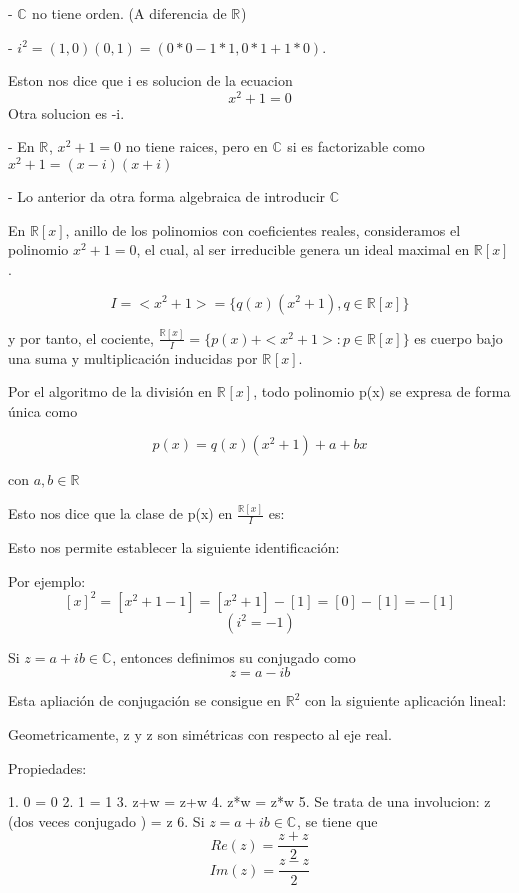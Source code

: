 - \( \mathbb{C}^{}\) no tiene orden. (A diferencia de \(\mathbb{R}^{}\))

- \(i^2 = (1,0)(0,1) = (0*0-1*1, 0*1+1*0)\).

Eston nos dice que i es solucion de la ecuacion
\begin{equation*}
  x^2+1=0
\end{equation*}
Otra solucion es -i.

- En \(\mathbb{R}^{}\), \(x^2+1=0 \) no tiene raices, pero en \(\mathbb{C}^{}\) si es factorizable como \(x^2+1= (x-i)(x+i)\)

- Lo anterior da otra forma algebraica de introducir \(\mathbb{C}^{}\)

En \(\mathbb{R}[x]\), anillo de los polinomios con coeficientes reales, consideramos el polinomio \(x^2+1=0\), el cual, al ser irreducible genera un ideal maximal en  \(\mathbb{R}[x]\).

\[ I = <x^2+1> = \{q(x)(x^2+1), q \in \mathbb{R}[x]\}\]

y por tanto, el cociente, \(\frac{\mathbb{R}[x]}{I} = \{p(x)+<x^2+1> : p \in \mathbb{R}[x]\}\) es cuerpo bajo una suma y multiplicación inducidas por \(\mathbb{R}^{}[x]\).

Por el algoritmo de la división en \(\mathbb{R}^{}[x]\), todo polinomio p(x) se expresa de forma única como

\[p(x) = q(x)(x^2+1) + a +bx\]

con \(a,b \in \mathbb{R}^{}\)

Esto nos dice que la clase de p(x) en \(\frac{\mathbb{R}[x]}{I}\) es:


Esto nos permite establecer la siguiente identificación:


Por ejemplo:
\[[x]^2=[x^2+1-1]=[x^2+1]-[1] = [0] - [1] = -[1]\]
\[(i^2 = -1)\]

\begin{definicion}
  Si \(z = a+ib \in \mathbb{C}^{}\), entonces definimos su conjugado como
  \[ z = a-ib\] %

  Esta apliación de conjugación se consigue en \(\mathbb{R}^{2}\) con la siguiente aplicación lineal:


  Geometricamente, z y z son simétricas con respecto al eje real.


  Propiedades:

  1. 0 = 0
  2. 1 = 1
  3. z+w = z+w
  4. z*w = z*w %
  5. Se trata de una involucion: z (dos veces conjugado ) = z
  6. Si \(z = a+ib \in \mathbb{C}^{}\), se tiene que
  \[ Re(z) = \frac{z+z}{2}\]
  \[Im(z) = \frac{z-z}{2}\]
\end{definicion}

